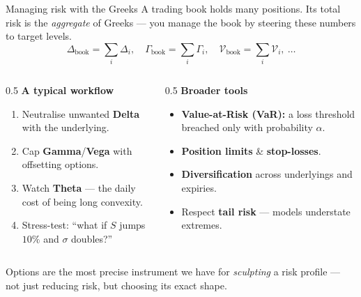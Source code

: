 \documentclass[11pt,aspectratio=169]{beamer}
\newcommand{\und}{S}                         %
\newcommand{\keybox}[1]{%
  \begin{beamercolorbox}[wd=\textwidth,sep=0.6em,rounded=true]{}%
    \colorbox{soft}{\parbox{\dimexpr\textwidth-1.4em}{\color{ink}#1}}%
  \end{beamercolorbox}}
\begin{document}
\begin{frame}{Managing risk with the Greeks}
  A trading book holds many positions. Its total risk is the \emph{aggregate}
  of Greeks — you manage the book by steering these numbers to target levels.
  \[
    \Delta_{\text{book}}=\sum_i \Delta_i,\quad
    \Gamma_{\text{book}}=\sum_i \Gamma_i,\quad
    \mathcal{V}_{\text{book}}=\sum_i \mathcal{V}_i,\ \dots
  \]
  \begin{columns}[T]
    \begin{column}{0.5\textwidth}
      \textbf{A typical workflow}
      \begin{enumerate}\small
        \item Neutralise unwanted \textbf{Delta} with the underlying.
        \item Cap \textbf{Gamma}/\textbf{Vega} with offsetting options.
        \item Watch \textbf{Theta} — the daily cost of being long convexity.
        \item Stress-test: ``what if $\und$ jumps $10\%$ and $\sigma$ doubles?''
      \end{enumerate}
    \end{column}
    \begin{column}{0.5\textwidth}
      \textbf{Broader tools}
      \begin{itemize}\small
        \item \textbf{Value-at-Risk (VaR):} a loss threshold breached only with probability $\alpha$.
        \item \textbf{Position limits} \& \textbf{stop-losses}.
        \item \textbf{Diversification} across underlyings and expiries.
        \item Respect \textbf{tail risk} — models understate extremes.
      \end{itemize}
    \end{column}
  \end{columns}
  \vspace{0.15em}
  \keybox{Options are the most precise instrument we have for \emph{sculpting} a risk profile — not just reducing risk, but choosing its exact shape.}
\end{frame}
\end{document}
